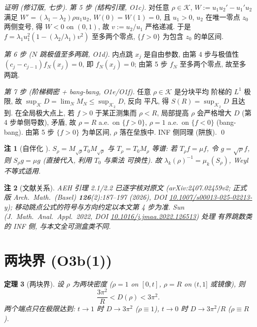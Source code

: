 \documentclass[UTF8]{ctexart}
\newtheorem{theorem}{定理}[section]
\newtheorem{remark}[theorem]{注}
\begin{document}
\begin{proof}[证明 (修订版, 七步)]
\emph{第 5 步 (结构引理, O1c).} 对任意 $\rho\in\mathcal K$, $W:=u_1u_2'-u_1'u_2$ 满足
$W'=(\lambda_1-\lambda_2)\rho u_1u_2$, $W(0)=W(1)=0$, 且 $u_1>0$, $u_2$ 在唯一零点
$z_0$ 两侧变号, 得 $W<0$ on $(0,1)$, 故 $v:=u_2/u_1$ 严格递减. 于是
$f=\lambda_1u_1^2(1-(\lambda_2/\lambda_1)v^2)$ 至多两个零点, $\{f>0\}$ 为包含 $z_0$
的单区间.

\emph{第 6 步 ($N$ 跳极值至多两跳, O1d).} 内点跳 $x_j$ 是自由参数, 由第 4 步与极值性
$(c_j-c_{j-1})f_N(x_j)=0$, 即 $f_N(x_j)=0$; 由第 5 步 $f_N$ 至多两个零点, 故至多两跳.

\emph{第 7 步 (阶梯稠密 + bang-bang, O1e/O1f).} 任意 $\rho\in\mathcal K$ 是分块平均
阶梯的 $L^1$ 极限, 故 $\sup_{\mathcal K}D=\lim_N M_N\le\sup_{\mathcal K_2}D$, 反向
平凡, 得 $S(R)=\sup_{\mathcal K_2}D$ 且达到. 在全局极大点上, 若 $f>0$ 于某正测集而
$\rho<R$, 局部提高 $\rho$ 会严格增大 $D$ (第 4 步单侧导数), 矛盾, 故
$\rho=R$ a.e.\ on $\{f>0\}$, $\rho=1$ a.e.\ on $\{f<0\}$ (bang-bang). 由第 5 步
$\{f>0\}$ 为单区间, $\rho$ 落在垒族中. INF 侧同理 (阱族). \qed
\end{proof}

\begin{remark}[自伴化 \label{rem:srho}]
$S_\rho=M_{\sqrt\rho}T_0M_{\sqrt\rho}$ 与 $T_\rho=T_0M_\rho$ 等谱: 若
$T_\rho f=\mu f$, 令 $g=\sqrt\rho f$, 则 $S_\rho g=\mu g$ (直接代入, 利用 $T_0$ 与乘法
可换性). 故 $\lambda_k(\rho)^{-1}=\mu_k(S_\rho)$, Weyl 不等式适用.
\end{remark}

\begin{remark}[文献关系]
AEH 引理 2.1/2.2 已逐字核对原文 (arXiv:2407.02459v2; 正式版 Arch.\ Math.\ (Basel)
\textbf{126}(2):187--197 (2026), DOI \href{https://doi.org/10.1007/s00013-025-02213-y}{10.1007/s00013-025-02213-y});
移动跳点公式的符号与方向约定以本文第 4 步为准. Sun (J.\ Math.\ Anal.\ Appl.\ 2022,
DOI \href{https://doi.org/10.1016/j.jmaa.2022.126513}{10.1016/j.jmaa.2022.126513}) 处理
有界跳数类的 INF 侧, 与本文全可测盒类不同.
\end{remark}

\section{两块界 (O3b(1))}

\begin{theorem}[两块界]
设 $\rho$ 为两块密度 ($\rho=1$ on $[0,t]$, $\rho=R$ on $(t,1]$ 或镜像), 则
\begin{equation}
	\frac{3\pi^2}{R}<D(\rho)<3\pi^2.
\end{equation}
两个端点只在极限达到: $t\to1$ 时 $D\to3\pi^2$ ($\rho\equiv1$), $t\to0$ 时
$D\to3\pi^2/R$ ($\rho\equiv R$).
\end{theorem}
\end{document}
